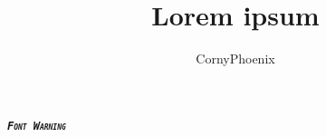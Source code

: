 \documentclass[12pt,a4paper]{article}
\author{CornyPhoenix}
\title{Lorem ipsum}
\begin{document}
	\textbf{\textsc{\textit{\texttt{\textsf{Font Warning}}}}}
\end{document}

